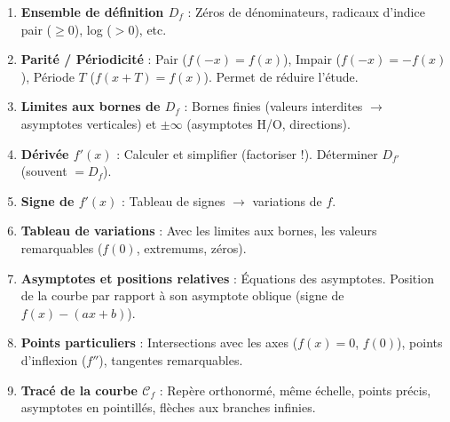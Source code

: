 \documentclass[11pt]{article}
\begin{document}
\begin{methode}
\begin{enumerate}
  \item \textbf{Ensemble de définition $D_f$} : Zéros de dénominateurs, radicaux d'indice pair ($\ge 0$), log ($>0$), etc.
  \item \textbf{Parité / Périodicité} : Pair ($f(-x)=f(x)$), Impair ($f(-x)=-f(x)$), Période $T$ ($f(x+T)=f(x)$). Permet de réduire l'étude.
  \item \textbf{Limites aux bornes de $D_f$} : Bornes finies (valeurs interdites $\to$ asymptotes verticales) et $\pm\infty$ (asymptotes H/O, directions).
  \item \textbf{Dérivée $f'(x)$} : Calculer et simplifier (factoriser !). Déterminer $D_{f'}$ (souvent $= D_f$).
  \item \textbf{Signe de $f'(x)$} : Tableau de signes $\to$ variations de $f$.
  \item \textbf{Tableau de variations} : Avec les limites aux bornes, les valeurs remarquables ($f(0)$, extremums, zéros).
  \item \textbf{Asymptotes et positions relatives} : Équations des asymptotes. Position de la courbe par rapport à son asymptote oblique (signe de $f(x)-(ax+b)$).
  \item \textbf{Points particuliers} : Intersections avec les axes ($f(x)=0$, $f(0)$), points d'inflexion ($f''$), tangentes remarquables.
  \item \textbf{Tracé de la courbe $\mathcal{C}_f$} : Repère orthonormé, même échelle, points précis, asymptotes en pointillés, flèches aux branches infinies.
\end{enumerate}
\end{methode}
\end{document}
